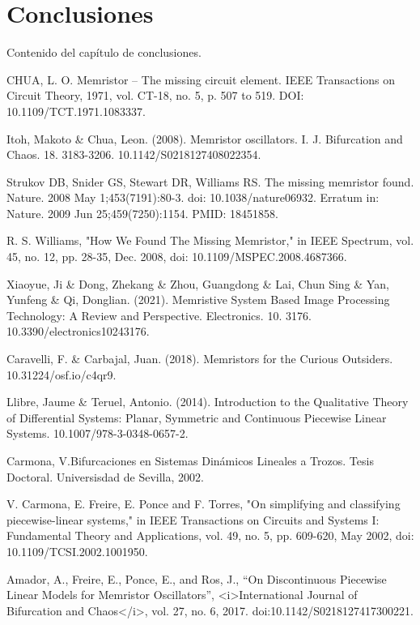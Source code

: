 \documentclass[12pt,a4paper]{report} %
\begin{document}
	\chapter*{Conclusiones}
	Contenido del capítulo de conclusiones.
	\newpage
	
	
	\begin{thebibliography}{99}
		 CHUA, L. O. Memristor – The missing circuit element. IEEE
		Transactions on Circuit Theory, 1971, vol. CT-18, no. 5, p. 507 to
		519. DOI: 10.1109/TCT.1971.1083337.
		
		 Itoh, Makoto \& Chua, Leon. (2008). Memristor oscillators. I. J. Bifurcation and Chaos. 18. 3183-3206. 10.1142/S0218127408022354. 
		
		 Strukov DB, Snider GS, Stewart DR, Williams RS. The missing memristor found. Nature. 2008 May 1;453(7191):80-3. doi: 10.1038/nature06932. Erratum in: Nature. 2009 Jun 25;459(7250):1154. PMID: 18451858.
		
		 R. S. Williams, "How We Found The Missing Memristor," in IEEE Spectrum, vol. 45, no. 12, pp. 28-35, Dec. 2008, doi: 10.1109/MSPEC.2008.4687366.
		
		 Xiaoyue, Ji \& Dong, Zhekang \& Zhou, Guangdong \& Lai, Chun Sing \& Yan, Yunfeng \& Qi, Donglian. (2021). Memristive System Based Image Processing Technology: A Review and Perspective. Electronics. 10. 3176. 10.3390/electronics10243176. 
		
		 Caravelli, F. \& Carbajal, Juan. (2018). Memristors for the Curious Outsiders. 10.31224/osf.io/c4qr9. 
		
		 Llibre, Jaume \& Teruel, Antonio. (2014). Introduction to the Qualitative Theory of Differential Systems: Planar, Symmetric and Continuous Piecewise Linear Systems. 10.1007/978-3-0348-0657-2. 
		
		 Carmona, V.Bifurcaciones en Sistemas Dinámicos Lineales a Trozos. Tesis Doctoral. Universisdad de Sevilla, 2002.
		
		 V. Carmona, E. Freire, E. Ponce and F. Torres, "On simplifying and classifying piecewise-linear systems," in IEEE Transactions on Circuits and Systems I: Fundamental Theory and Applications, vol. 49, no. 5, pp. 609-620, May 2002, doi: 10.1109/TCSI.2002.1001950.
		
		 Amador, A., Freire, E., Ponce, E., and Ros, J., “On Discontinuous Piecewise Linear Models for Memristor Oscillators”, <i>International Journal of Bifurcation and Chaos</i>, vol. 27, no. 6, 2017. doi:10.1142/S0218127417300221.
		

\end{thebibliography}
\end{document}

